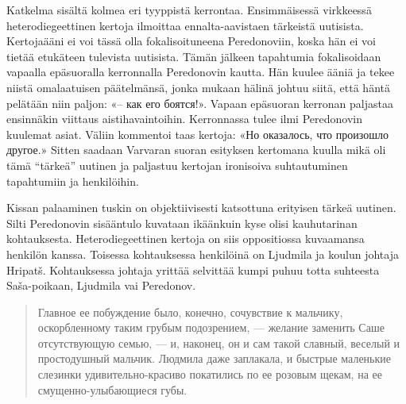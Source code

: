 \documentclass[12pt,a4paper]{article}
\begin{document}
Katkelma sisältä kolmea eri tyyppistä kerrontaa. Ensimmäisessä virkkeessä
heterodiegeettinen kertoja ilmoittaa ennalta-aavistaen tärkeistä uutisista.
Kertojaääni ei voi tässä olla fokalisoituneena Peredonoviin, koska
hän ei voi tietää etukäteen tulevista uutisista. Tämän jälkeen tapahtumia
fokalisoidaan vapaalla epäsuoralla kerronnalla Peredonovin kautta.
Hän kuulee ääniä ja tekee niistä omalaatuisen päätelmänsä, jonka mukaan hälinä
johtuu siitä, että häntä pelätään niin paljon: «– как его боятся!».
Vapaan epäsuoran kerronan paljastaa ensinnäkin viittaus aistihavaintoihin. Kerronnassa tulee ilmi Peredonovin kuulemat asiat. Väliin kommentoi taas kertoja: «Но оказалось, что произошло другое.» Sitten saadaan
Varvaran suoran esityksen kertomana kuulla mikä oli tämä \enquote{tärkeä} uutinen ja
paljastuu kertojan ironisoiva suhtautuminen tapahtumiin ja henkilöihin.

Kissan palaaminen tuskin on objektiivisesti katsottuna erityisen tärkeä uutinen.
Silti Peredonovin sisääntulo kuvataan ikäänkuin kyse olisi kauhutarinan 
kohtauksesta. Heterodiegeettinen kertoja on siis oppositiossa kuvaamansa henkilön kanssa.
% 
% 
Toisessa kohtauksessa henkilöinä on Ljudmila ja koulun johtaja Hripatš. Kohtauksessa johtaja yrittää selvittää kumpi puhuu totta suhteesta Saša-poikaan, Ljudmila vai Peredonov.

\begin{quote}
Главное ее побуждение было,
конечно, сочувствие к мальчику, оскорбленному таким грубым 
подозрением, — желание заменить Саше отсутствующую семью, — и, 
наконец, он и сам такой славный, веселый и простодушный мальчик. 
Людмила даже заплакала, и быстрые маленькие слезинки 
удивительно-красиво покатились по ее розовым щекам, на ее смущенно-улыбающиеся
губы. \parencite[239]{sologub2004}
\end{quote}
\end{document}
